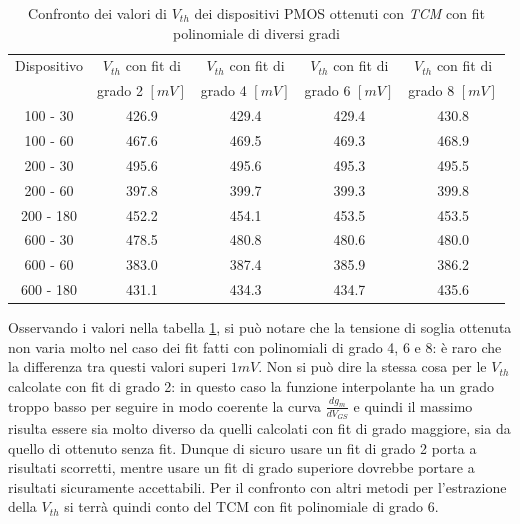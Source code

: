 \documentclass[12pt, letterpaper]{book}
\begin{document}
\begin{table}[htp]
  \renewcommand{\arraystretch}{1.3}
  \caption{Confronto dei valori di $V_{th}$ dei dispositivi PMOS ottenuti con \emph{TCM} con fit polinomiale di diversi gradi}
  \label{tab:GradiTCM}
  \begin{center}
    \begin{tabular}{c c c c c}
      \hline
      Dispositivo & $V_{th}$  con fit di & $V_{th}$  con fit di & $V_{th}$  con fit di & $V_{th}$  con fit di \\
                  & grado 2 $[mV]$       & grado 4 $[mV]$       & grado 6 $[mV]$       & grado 8 $[mV]$       \\
      \hline
      100 - 30    & 426.9                & 429.4                & 429.4                & 430.8                \\
      \hline
      100 - 60    & 467.6                & 469.5                & 469.3                & 468.9                \\
      \hline
      200 - 30    & 495.6                & 495.6                & 495.3                & 495.5                \\
      \hline
      200 - 60    & 397.8                & 399.7                & 399.3                & 399.8                \\
      \hline
      200 - 180   & 452.2                & 454.1                & 453.5                & 453.5                \\
      \hline
      600 - 30    & 478.5                & 480.8                & 480.6                & 480.0                \\
      \hline
      600 - 60    & 383.0                & 387.4                & 385.9                & 386.2                \\
      \hline
      600 - 180   & 431.1                & 434.3                & 434.7                & 435.6                \\
      \hline
    \end{tabular}
  \end{center}
\end{table}

Osservando i valori nella tabella \ref{tab:GradiTCM}, si può notare che la tensione di soglia ottenuta non varia molto nel caso dei fit fatti con polinomiali di grado 4, 6 e 8: è raro che la differenza tra questi valori superi $1 mV$. Non si può dire la stessa cosa per le $V_{th}$ calcolate con fit di grado 2: in questo caso la funzione interpolante ha un grado troppo basso per seguire in modo coerente la curva $\frac{dg_m}{dV_{GS}}$ e quindi il massimo risulta essere sia molto diverso da quelli calcolati con fit di grado maggiore, sia da quello di ottenuto senza fit. Dunque di sicuro usare un fit di grado 2 porta a risultati scorretti, mentre usare un fit di grado superiore dovrebbe portare a risultati sicuramente accettabili. Per il confronto con altri metodi per l'estrazione della $V_{th}$ si terrà quindi conto del TCM con fit polinomiale di grado 6.
\end{document}
